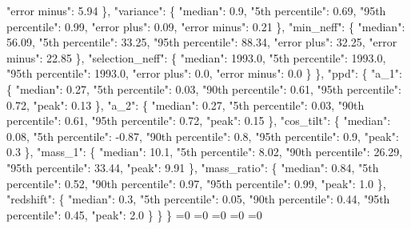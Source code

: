{{          "error minus": 5.94%
        \}, %
        "variance": \{%
          "median": 0.9, %
          "5th percentile": 0.69, %
          "95th percentile": 0.99, %
          "error plus": 0.09, %
          "error minus": 0.21%
        \}, %
        "min\_neff": \{%
          "median": 56.09, %
          "5th percentile": 33.25, %
          "95th percentile": 88.34, %
          "error plus": 32.25, %
          "error minus": 22.85%
        \}, %
        "selection\_neff": \{%
          "median": 1993.0, %
          "5th percentile": 1993.0, %
          "95th percentile": 1993.0, %
          "error plus": 0.0, %
          "error minus": 0.0%
        \}%
      \}, %
      "ppd": \{%
        "a\_1": \{%
          "median": 0.27, %
          "5th percentile": 0.03, %
          "90th percentile": 0.61, %
          "95th percentile": 0.72, %
          "peak": 0.13%
        \}, %
        "a\_2": \{%
          "median": 0.27, %
          "5th percentile": 0.03, %
          "90th percentile": 0.61, %
          "95th percentile": 0.72, %
          "peak": 0.15%
        \}, %
        "cos\_tilt": \{%
          "median": 0.08, %
          "5th percentile": {-}0.87, %
          "90th percentile": 0.8, %
          "95th percentile": 0.9, %
          "peak": 0.3%
        \}, %
        "mass\_1": \{%
          "median": 10.1, %
          "5th percentile": 8.02, %
          "90th percentile": 26.29, %
          "95th percentile": 33.44, %
          "peak": 9.91%
        \}, %
        "mass\_ratio": \{%
          "median": 0.84, %
          "5th percentile": 0.52, %
          "90th percentile": 0.97, %
          "95th percentile": 0.99, %
          "peak": 1.0%
        \}, %
        "redshift": \{%
          "median": 0.3, %
          "5th percentile": 0.05, %
          "90th percentile": 0.44, %
          "95th percentile": 0.45, %
          "peak": 2.0%
        \}%
      \}%
    \}}%
  \else%
    \ifnum{}=0%
      \def\MagTruncnormIndTiltIsotropicTruncnormNid@out{%
    {-}1034.43}%
    \else%
      \ifnum{}=0%
      \def\MagTruncnormIndTiltIsotropicTruncnormNid@out{%
    0.25}%
    \else%
      \ifnum{}=0%
      \def\MagTruncnormIndTiltIsotropicTruncnormNid@out{%
    {-}2.13}%
    \else%
      \ifnum{}=0%
      \def\MagTruncnormIndTiltIsotropicTruncnormNid@out{%
    {-}1.49}%
    \else%
      \ifnum{}=0%
      \let\MagTruncnormIndTiltIsotropicTruncnormNid@out\MagTruncnormIndTiltIsotropicTruncnormNid@I%
}

